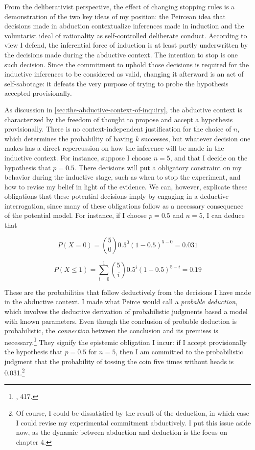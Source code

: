 From the deliberativist perspective, the effect of changing stopping rules is a demonstration of the two key ideas of my position: the Peircean idea that decisions made in abduction contextualize inferences made in induction and the voluntarist ideal of rationality as self-controlled deliberate conduct. According to view I defend, the inferential force of induction is at least partly underwritten by the decisions made during the abductive context. The intention to stop is one such decision. Since the commitment to uphold those decisions is required for the inductive inferences to be considered as valid, changing it afterward is an act of self-sabotage: it defeats the very purpose of trying to probe the hypothesis accepted provisionally. 


As discussion in \ref{sec:the-abductive-context-of-inquiry}, the abductive context is characterized by the freedom of thought to propose and accept a hypothesis provisionally. There is no context-independent justification for the
choice of \(n\), which determines the probability of having \(k\)
successes, but whatever decision one makes has a direct repercussion on how the inference will be made in the inductive context.  For instance, suppose I choose  \(n=5\), and that I decide on the hypothesis that \(p=0.5\). There decisions will put a obligatory constraint on my behavior during the inductive stage, such as when to stop the experiment, and how to revise my belief in light of the evidence. We can, however, explicate these  obligations that these potential decisions imply by engaging in a deductive interrogation, since many of these obligations follow as a necessary consequence of the potential model. For instance, if I choose \(p=0.5\) and \(n=5\), I can deduce that

\[P(X=0) = {5 \choose 0} 0.5^0 (1-0.5)^{5-0} = 0.031\]

\[P(X\leq 1) = \sum_{i=0}^1 {5 \choose i } 0.5^i (1-0.5)^{5-i} = 0.19\]

These are the probabilities that follow deductively from the decisions I
have made in the abductive context. I made what Peirce would call a
\emph{probable deduction}, which involves the deductive derivation of
probabilistic judgments based a model with known parameters. Even though
the conclusion of probable deduction is probabilistic, the
\emph{connection} between the conclusion and its premises is
necessary.\footnote{\cite{probableinference}, 417.}
They signify the epistemic obligation I incur: if I accept
provisionally the hypothesis that \(p=0.5\) for \(n=5\), then I am
committed to the probabilistic judgment that the probability of tossing
the coin five times without heads is 0.031.\footnote{Of course, I could
  be dissatisfied by the result of the deduction, in which case I could
  revise my experimental commitment abductively. I put this issue aside
  now, as the dynamic between abduction and deduction is the focus on
  chapter 4.}

